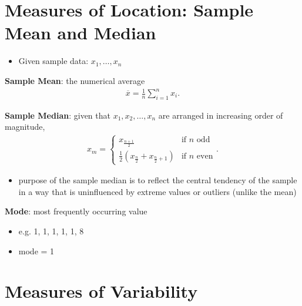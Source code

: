 \documentclass[10pt]{article}
\begin{document}
\section{Measures of Location: Sample Mean and Median}
\begin{itemize}
    \item Given sample data: $x_1, \ldots, x_n$
\end{itemize}
\begin{definition}
    \textbf{Sample Mean}: the numerical average
    \begin{align*}
        \overline{x} = \frac{1}{n} \sum_{i=1}^n x_i
    .\end{align*}
\end{definition}
\begin{definition}
    \textbf{Sample Median}: given that $ x_1, x_2, \ldots, x_n$ are arranged in increasing order of magnitude,
    \begin{align*}
        x_m =
        \begin{cases}
            x_{\frac{n+1}{2}} & \text{if $n$ odd} \\ 
            \frac{1}{2}\left( x_{\frac{n}{2}} + x_{\frac{n}{2}+1} \right) & \text{if $n$ even}
        \end{cases}
    .\end{align*}
    \begin{itemize}
        \item purpose of the sample median is to reflect the central tendency of the sample in a way that is uninfluenced by extreme values or outliers (unlike the mean)
    \end{itemize}
\end{definition}
\begin{definition}
    \textbf{Mode}: most frequently occurring value
    \begin{itemize}
        \item e.g. 1, 1, 1, 1, 1, 8
        \item mode = 1
    \end{itemize}
\end{definition}

\section{Measures of Variability}
\end{document}
